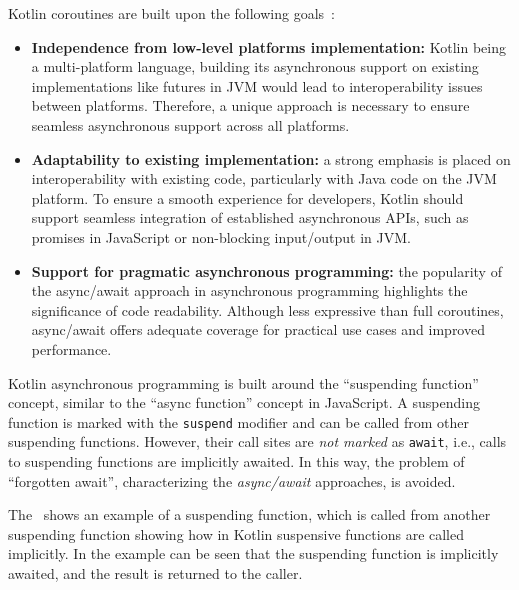 Kotlin coroutines are built upon the following goals~\cite{elizarov2021kotlin}:
\begin{itemize}
	\item \textbf{Independence from low-level platforms implementation:} Kotlin being a multi-platform language, building its asynchronous support on
	      existing implementations like futures in JVM would lead to interoperability issues between platforms. Therefore, a unique approach is
	      necessary to ensure seamless asynchronous support across all platforms.
	\item \textbf{Adaptability to existing implementation:} a strong emphasis is placed on interoperability with existing code, particularly with
	      Java code on the JVM platform. To ensure a smooth experience for developers, Kotlin should support seamless integration of established
	      asynchronous APIs, such as promises in JavaScript or non-blocking input/output in JVM.
	\item \textbf{Support for pragmatic asynchronous programming:} the popularity of the async/await approach in asynchronous programming highlights
	      the significance of code readability. Although less expressive than full coroutines, async/await offers adequate coverage for practical use
	      cases and improved performance.
\end{itemize}

Kotlin asynchronous programming is built around the ``suspending function'' concept, similar to the ``async function'' concept in JavaScript.
A suspending function is marked with the \texttt{suspend} modifier and can be called from other suspending functions. However, their call sites
are \emph{not marked} as \texttt{await}, i.e., calls to suspending functions are implicitly awaited.
In this way, the problem of ``forgotten await'', characterizing the \emph{async/await} approaches, is avoided.

The~ shows an example of a suspending function, which is called from another suspending function showing how
in Kotlin suspensive functions are called implicitly.
In the example can be seen that the suspending function is implicitly awaited, and the result is returned to the caller.



